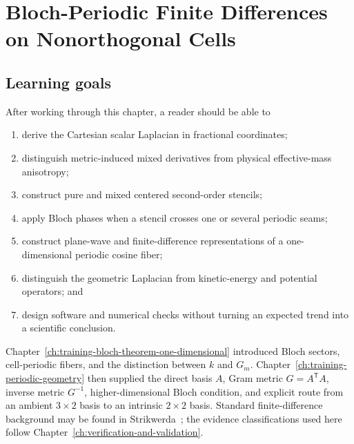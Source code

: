 \chapter{Bloch-Periodic Finite Differences on Nonorthogonal Cells}

\label{ch:training-bloch-finite-differences}


\section{Learning goals}

After working through this chapter, a reader should be able to

\begin{enumerate}
  \item derive the Cartesian scalar Laplacian in fractional coordinates;
  \item distinguish metric-induced mixed derivatives from physical
        effective-mass anisotropy;
  \item construct pure and mixed centered second-order stencils;
  \item apply Bloch phases when a stencil crosses one or several periodic
        seams;
  \item construct plane-wave and finite-difference representations of a
        one-dimensional periodic cosine fiber;
  \item distinguish the geometric Laplacian from kinetic-energy and potential
        operators; and
  \item design software and numerical checks without turning an expected trend
        into a scientific conclusion.
\end{enumerate}

Chapter~\ref{ch:training-bloch-theorem-one-dimensional} introduced Bloch
sectors, cell-periodic fibers, and the distinction between $k$ and $G_m$.
Chapter~\ref{ch:training-periodic-geometry} then supplied the direct basis $A$,
Gram metric $G=A^{\mathsf T}A$, inverse metric $G^{-1}$, higher-dimensional
Bloch condition, and explicit route from an ambient $3\times2$ basis to an
intrinsic $2\times2$ basis. Standard finite-difference background may be found
in Strikwerda~\cite{strikwerda2004};
the evidence classifications used here follow
Chapter~\ref{ch:verification-and-validation}.

